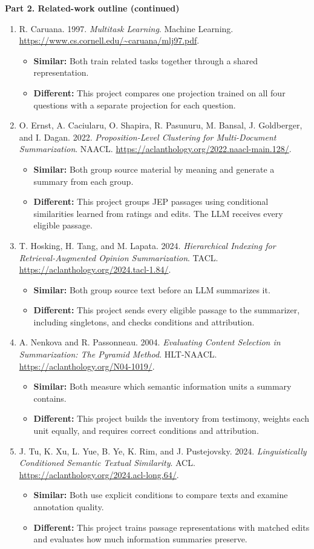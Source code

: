 \documentclass[11pt,letterpaper]{article}
\newcommand{\paperentry}[3]{\item\relax #1
\begin{itemize}\item \textbf{Similar:} #2
\item \textbf{Different:} #3\end{itemize}\vspace{5pt}}
\begin{document}
\clearpage
\textbf{Part 2. Related-work outline (continued)}
\begin{enumerate}[label=\textbf{\arabic*.},leftmargin=*,start=6]
\paperentry{R. Caruana. 1997. \emph{Multitask Learning}. Machine Learning. \url{https://www.cs.cornell.edu/~caruana/mlj97.pdf}.}
{Both train related tasks together through a shared representation.}
{This project compares one projection trained on all four questions with a separate projection for each question.}

\paperentry{O. Ernst, A. Caciularu, O. Shapira, R. Pasunuru, M. Bansal, J. Goldberger, and I. Dagan. 2022. \emph{Proposition-Level Clustering for Multi-Document Summarization}. NAACL. \url{https://aclanthology.org/2022.naacl-main.128/}.}
{Both group source material by meaning and generate a summary from each group.}
{This project groups JEP passages using conditional similarities learned from ratings and edits. The LLM receives every eligible passage.}

\paperentry{T. Hosking, H. Tang, and M. Lapata. 2024. \emph{Hierarchical Indexing for Retrieval-Augmented Opinion Summarization}. TACL. \url{https://aclanthology.org/2024.tacl-1.84/}.}
{Both group source text before an LLM summarizes it.}
{This project sends every eligible passage to the summarizer, including singletons, and checks conditions and attribution.}

\paperentry{A. Nenkova and R. Passonneau. 2004. \emph{Evaluating Content Selection in Summarization: The Pyramid Method}. HLT-NAACL. \url{https://aclanthology.org/N04-1019/}.}
{Both measure which semantic information units a summary contains.}
{This project builds the inventory from testimony, weights each unit equally, and requires correct conditions and attribution.}

\paperentry{J. Tu, K. Xu, L. Yue, B. Ye, K. Rim, and J. Pustejovsky. 2024. \emph{Linguistically Conditioned Semantic Textual Similarity}. ACL. \url{https://aclanthology.org/2024.acl-long.64/}.}
{Both use explicit conditions to compare texts and examine annotation quality.}
{This project trains passage representations with matched edits and evaluates how much information summaries preserve.}
\end{enumerate}
\end{document}
